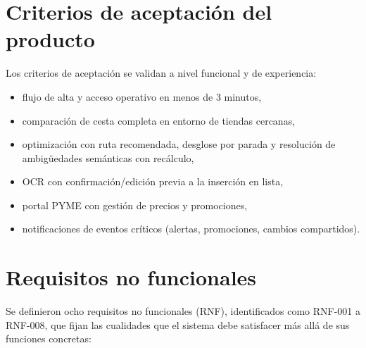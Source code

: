 \section{Criterios de aceptaci\'on del producto}

Los criterios de aceptaci\'on se validan a nivel funcional y de experiencia:

\begin{itemize}
	\item flujo de alta y acceso operativo en menos de 3 minutos,
	\item comparaci\'on de cesta completa en entorno de tiendas cercanas,
	\item optimizaci\'on con ruta recomendada, desglose por parada y resoluci\'on de
		ambig\"uedades sem\'anticas con rec\'alculo,
	\item OCR con confirmaci\'on/edici\'on previa a la inserci\'on en lista,
	\item portal PYME con gesti\'on de precios y promociones,
	\item notificaciones de eventos cr\'iticos (alertas, promociones, cambios compartidos).
\end{itemize}

\section{Requisitos no funcionales}

Se definieron ocho requisitos no funcionales (RNF), identificados como RNF-001 a RNF-008, que
fijan las cualidades que el sistema debe satisfacer m\'as all\'a de sus funciones concretas:

